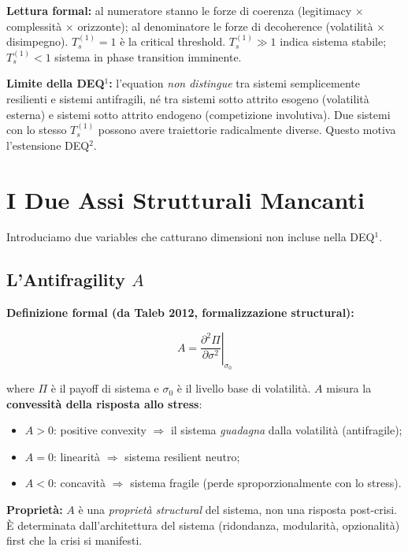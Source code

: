 \Proved{} \textbf{Lettura formal:} al numeratore stanno le forze di
coerenza (legitimacy $\times$ complessità $\times$ orizzonte); al denominatore le
forze di decoherence (volatilità $\times$ disimpegno). \(T_s^{(1)} = 1\) è la
critical threshold. \(T_s^{(1)} \gg 1\) indica sistema stabile;
\(T_s^{(1)} < 1\) sistema in phase transition imminente.

\Conj{} \textbf{Limite della DEQ$^1$:} l'equation \emph{non distingue} tra
sistemi semplicemente resilienti e sistemi antifragili, né tra sistemi
sotto attrito esogeno (volatilità esterna) e sistemi sotto attrito
endogeno (competizione involutiva). Due sistemi con lo stesso
\(T_s^{(1)}\) possono avere traiettorie radicalmente diverse. Questo
motiva l'estensione DEQ$^2$.



\section{I Due Assi Strutturali
Mancanti}\label{i-due-assi-strutturali-mancanti}

Introduciamo due variables che catturano dimensioni non incluse nella
DEQ$^1$.

\subsection{\texorpdfstring{L'Antifragility
\(A\)}{L'Antifragility A}}\label{lantifragilituxe0-a}

\Proved{} \textbf{Definizione formal (da Taleb 2012, formalizzazione
structural):}

\[
A = \left.\frac{\partial^2 \Pi}{\partial \sigma^2}\right|_{\sigma_0}
\]

where \(\Pi\) è il payoff di sistema e \(\sigma_0\) è il livello base di
volatilità. \(A\) misura la \textbf{convessità della risposta allo
stress}:

\begin{itemize}
\tightlist
\item
  \(A > 0\): positive convexity $\Rightarrow$ il sistema \emph{guadagna} dalla
  volatilità (antifragile);
\item
  \(A = 0\): linearità $\Rightarrow$ sistema resilient neutro;
\item
  \(A < 0\): concavità $\Rightarrow$ sistema fragile (perde sproporzionalmente con
  lo stress).
\end{itemize}

\Hypoth{} \textbf{Proprietà:} \(A\) è una \emph{proprietà structural}
del sistema, non una risposta post-crisi. È determinata
dall'architettura del sistema (ridondanza, modularità, opzionalità)
first che la crisi si manifesti.


